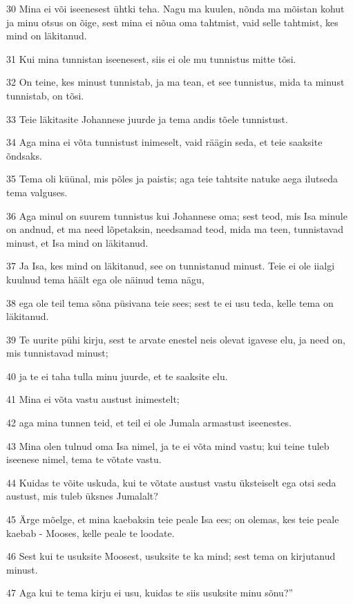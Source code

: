 \par 30 Mina ei või iseenesest ühtki teha. Nagu ma kuulen, nõnda ma mõistan kohut ja minu otsus on õige, sest mina ei nõua oma tahtmist, vaid selle tahtmist, kes mind on läkitanud.
\par 31 Kui mina tunnistan iseenesest, siis ei ole mu tunnistus mitte tõsi.
\par 32 On teine, kes minust tunnistab, ja ma tean, et see tunnistus, mida ta minust tunnistab, on tõsi.
\par 33 Teie läkitasite Johannese juurde ja tema andis tõele tunnistust.
\par 34 Aga mina ei võta tunnistust inimeselt, vaid räägin seda, et teie saaksite õndsaks.
\par 35 Tema oli küünal, mis põles ja paistis; aga teie tahtsite natuke aega ilutseda tema valguses.
\par 36 Aga minul on suurem tunnistus kui Johannese oma; sest teod, mis Isa minule on andnud, et ma need lõpetaksin, needsamad teod, mida ma teen, tunnistavad minust, et Isa mind on läkitanud.
\par 37 Ja Isa, kes mind on läkitanud, see on tunnistanud minust. Teie ei ole iialgi kuulnud tema häält ega ole näinud tema nägu,
\par 38 ega ole teil tema sõna püsivana teie sees; sest te ei usu teda, kelle tema on läkitanud.
\par 39 Te uurite pühi kirju, sest te arvate enestel neis olevat igavese elu, ja need on, mis tunnistavad minust;
\par 40 ja te ei taha tulla minu juurde, et te saaksite elu.
\par 41 Mina ei võta vastu austust inimestelt;
\par 42 aga mina tunnen teid, et teil ei ole Jumala armastust iseenestes.
\par 43 Mina olen tulnud oma Isa nimel, ja te ei võta mind vastu; kui teine tuleb iseenese nimel, tema te võtate vastu.
\par 44 Kuidas te võite uskuda, kui te võtate austust vastu üksteiselt ega otsi seda austust, mis tuleb üksnes Jumalalt?
\par 45 Ärge mõelge, et mina kaebaksin teie peale Isa ees; on olemas, kes teie peale kaebab - Mooses, kelle peale te loodate.
\par 46 Sest kui te usuksite Moosest, usuksite te ka mind; sest tema on kirjutanud minust.
\par 47 Aga kui te tema kirju ei usu, kuidas te siis usuksite minu sõnu?”


